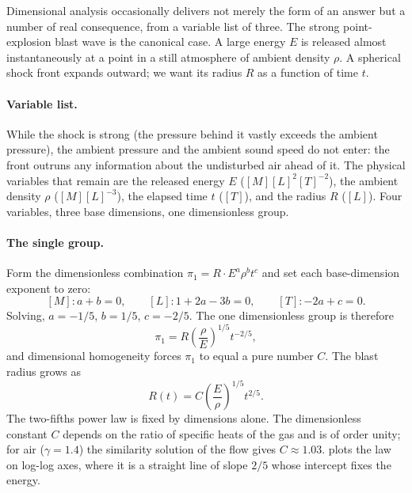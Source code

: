 Dimensional analysis occasionally delivers not merely the form of an
answer but a number of real consequence, from a variable list of
three. The strong point-explosion blast wave is the canonical case.
A large energy $E$ is released almost instantaneously at a point in a
still atmosphere of ambient density $\rho$. A spherical shock front
expands outward; we want its radius $R$ as a function of time $t$.

\paragraph{Variable list.} While the shock is strong (the pressure
behind it vastly exceeds the ambient pressure), the ambient pressure
and the ambient sound speed do not enter: the front outruns any
information about the undisturbed air ahead of it. The physical
variables that remain are the released energy $E$
($[M][L]^{2}[T]^{-2}$), the ambient density $\rho$ ($[M][L]^{-3}$),
the elapsed time $t$ ($[T]$), and the radius $R$ ($[L]$). Four
variables, three base dimensions, one dimensionless group.

\paragraph{The single group.} Form the dimensionless combination
$\pi_{1} = R \cdot E^{a} \rho^{b} t^{c}$ and set each base-dimension
exponent to zero:
\[
[M]: a + b = 0, \qquad
[L]: 1 + 2a - 3b = 0, \qquad
[T]: -2a + c = 0.
\]
Solving, $a = -1/5$, $b = 1/5$, $c = -2/5$. The one dimensionless
group is therefore
\[
\pi_{1} = R \left(\frac{\rho}{E}\right)^{1/5} t^{-2/5},
\]
and dimensional homogeneity forces $\pi_{1}$ to equal a pure number
$C$. The blast radius grows as
\[
R(t) = C \left(\frac{E}{\rho}\right)^{1/5} t^{2/5}.
\]
The two-fifths power law is fixed by dimensions alone. The
dimensionless constant $C$ depends on the ratio of specific heats of
the gas and is of order unity; for air ($\gamma = 1.4$) the
similarity solution of the flow gives $C \approx 1.03$.
 plots the law on log-log axes,
where it is a straight line of slope $2/5$ whose intercept fixes the
energy.

